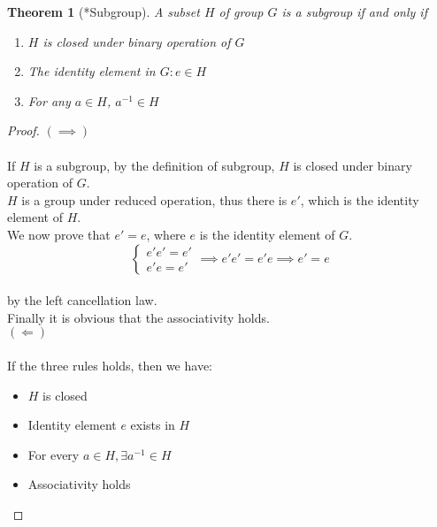 \documentclass{article}
\theoremstyle{MyNonumberplain}
\theoremstyle{break}
\newtheorem*{proof}{Proof. }
\theoremstyle{break}
\newtheorem{theorem}{Theorem}[section]
\theoremstyle{break}
\theoremstyle{definition}
\theoremstyle{break}
\begin{document}
\begin{thmbox}
    \begin{theorem}[*Subgroup]
        A subset $H$ of group $G$ is a subgroup if and only if\\
        \begin{enumerate}
            \item $H$ is closed under binary operation of $G$\\
            \item The identity element in $G: e\in H$\\
            \item For any $a\in H$, $a^{-1}\in H$\\
        \end{enumerate}
    \end{theorem}
    \begin{prfbox}
        \begin{proof}
            $(\implies)$\\\\
            If $H$ is a subgroup, by the definition of subgroup, $H$ is closed under
            binary operation of $G$.\\
    
            $H$ is a group under reduced operation, thus there is $e'$, which is the
            identity element of $H$. \\
            
            We now prove that $e' = e$, where $e$ is the identity element of $G$.\\
    
            \[ \left\{\begin{array}{l}
                e' e' = e'\\
                e' e = e'
            \end{array}\right. \implies e' e' = e' e \implies e' = e \]\\
    
            by the left cancellation law.\\
    
            Finally it is obvious that the associativity holds.\\
    
            $(\Longleftarrow)$\\\\
            If the three rules holds, then we have:\\
    
            \begin{itemize}
                \item $H$ is closed\\
                \item Identity element $e$ exists in $H$\\
                \item For every $a\in H,\exists a^{-1}\in H$\\
                \item Associativity holds
            \end{itemize}
    

\end{proof}
\end{prfbox}
\end{thmbox}
\end{document}
